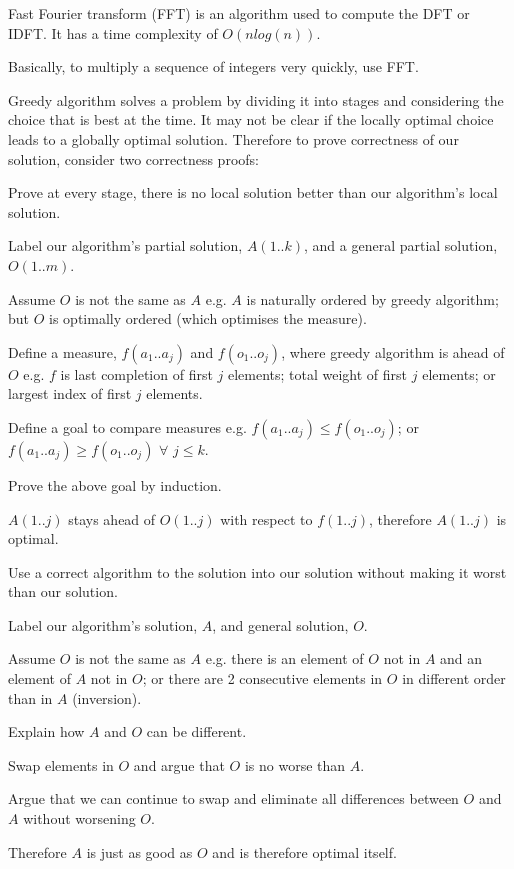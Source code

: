     Fast Fourier transform (FFT) is an algorithm used to compute the DFT or IDFT. It has a time complexity of $O(nlog(n))$.

    Basically, to multiply a sequence of integers very quickly, use FFT.

\subject{Greedy Algorithm}

    Greedy algorithm solves a problem by dividing it into stages and considering the choice that is best at the time. It may not be clear if the locally optimal choice leads to a globally optimal solution. Therefore to prove correctness of our solution, consider two correctness proofs:


        Prove at every stage, there is no local solution better than our algorithm's local solution.

        \startitemize[n]
            \item Label our algorithm's partial solution, $A(1..k)$, and a general partial solution, $O(1..m)$.
            \item Assume $O$ is not the same as $A$ e.g. $A$ is naturally ordered by greedy algorithm; but $O$ is optimally ordered (which optimises the measure).
            \item Define a measure, $f(a_{1}..a_{j})$ and $f(o_{1}..o_{j})$, where greedy algorithm is ahead of $O$ e.g. $f$ is last completion of first $j$ elements; total weight of first $j$ elements; or largest index of first $j$ elements.
            \item Define a goal to compare measures e.g. $f(a_{1}..a_{j}) \leq f(o_{1}..o_{j})$; or $f(a_{1}..a_{j}) \geq f(o_{1}..o_{j})$ $\forall$ $j \leq k$.
            \item Prove the above goal by induction.
            \item $A(1..j)$ stays ahead of $O(1..j)$ with respect to $f(1..j)$, therefore $A(1..j)$ is optimal.
        \stopitemize


        Use a correct algorithm to the solution into our solution without making it worst than our solution.

        \startitemize[n]
            \item Label our algorithm's solution, $A$, and general solution, $O$.
            \item Assume $O$ is not the same as $A$ e.g. there is an element of $O$ not in $A$ and an element of $A$ not in $O$; or there are 2 consecutive elements in $O$ in different order than in $A$ (inversion).
            \item Explain how $A$ and $O$ can be different.
            \item Swap elements in $O$ and argue that $O$ is no worse than $A$.
            \item Argue that we can continue to swap and eliminate all differences between $O$ and $A$ without worsening $O$.
            \item Therefore $A$ is just as good as $O$ and is therefore optimal itself.
        \stopitemize

